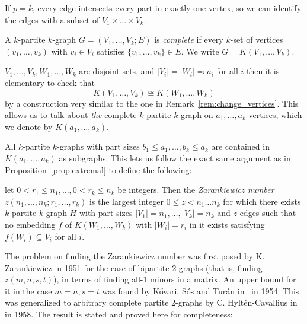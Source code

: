 \begin{remark}
    If $p=k$, every edge intersects every part in exactly one vertex,
    so we can identify the edges with a subset of $ V_1 \times \dots \times V_k$.
\end{remark}

\begin{definition}
    A $k$-partite $k$-graph $G = (V_1, \dots, V_k; E)$ is \emph{complete}
    if every $k$-set of vertices $(v_1, \dots, v_k)$ with $v_i \in V_i$
    satisfies $\{v_1, \dots, v_k\} \in E$.
    We write $G = K(V_1, \dots, V_k)$.
\end{definition}

\begin{remark}
    $V_1, \dots, V_k, W_1, \dots, W_k$ are disjoint sets,
    and $|V_i| = |W_i| \eqqcolon a_i$ for all $i$ then it is elementary to check that
    \[
        K(V_1, \dots, V_k) \cong K(W_1, \dots, W_k)
    \]
    by a construction very similar to the one in Remark~\ref{rem:change_vertices}.
    This allows us to talk about \emph{the} complete $k$-partite $k$-graph on
    $a_1, \dots, a_k$ vertices, which we denote by $K(a_1, \dots, a_k)$.
\end{remark}


\begin{remark}
    All $k$-partite $k$-graphs with part sizes $b_1 \leq a_1, \dots, b_k \leq a_k$
    are contained in $K(a_1, \dots, a_k)$ as subgraphs.
    This lets us follow the exact same argument as in Proposition~\ref{prop:extremal}
    to define the following:
\end{remark}

\begin{definition}\label{def:zarankiewicz}
    let $0 < r_1 \leq n_1, \dots, 0 < r_k \leq n_k$ be integers.
    Then the \emph{Zarankiewicz number} $z(n_1, \dots, n_k; r_1, \dots, r_k)$
    is the largest integer $0 \leq z < n_1  \dots n_k$ for which there exists $k$-partite $k$-graph
    $H$ with part sizes $ |V_1| = n_1, \dots, |V_k| = n_k$ and $z$ edges
    such that no embedding $f$ of $K(W_1, \dots, W_k)$ with $|W_i| = r_i$ in it exists
    satisfying $f(W_i) \subseteq V_i$ for all $i$.
\end{definition}

The problem on finding the Zarankiewicz number was first posed by K. Zarankiewicz in 1951 for the
case of bipartite 2-graphs (that is, finding $z(m, n; s, t)$),
in terms of finding all-1 minors in a matrix.
An upper bound for it in the case $m=n, s=t$ was found by Kővari, Sós and Turán in~\cite{Kovari1954} in 1954.
This was generalized to arbitrary complete
partite 2-graphs by C. Hyltén-Cavallius in~\cite{Hylten1958}
in 1958.
The result is stated and proved here for completeness:

